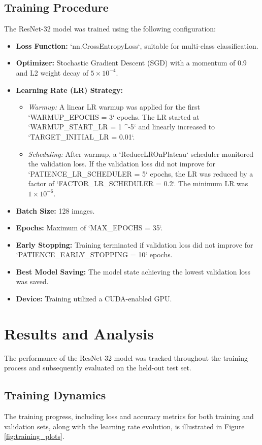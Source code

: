 \documentclass[11pt, a4paper]{article}
\begin{document}
\subsection{Training Procedure}
The ResNet-32 model was trained using the following configuration:
\begin{itemize}[itemsep=0.5em]
    \item \textbf{Loss Function:} `nn.CrossEntropyLoss`, suitable for multi-class classification.
    \item \textbf{Optimizer:} Stochastic Gradient Descent (SGD) with a momentum of 0.9 and L2 weight decay of $5 \times 10^{-4}$.
    \item \textbf{Learning Rate (LR) Strategy:}
        \begin{itemize}[itemsep=0.3em]
            \item \textit{Warmup:} A linear LR warmup was applied for the first `WARMUP_EPOCHS = 3` epochs. The LR started at `WARMUP_START_LR = 1 ^{-5}` and linearly increased to `TARGET_INITIAL_LR = 0.01`.
            \item \textit{Scheduling:} After warmup, a `ReduceLROnPlateau` scheduler monitored the validation loss. If the validation loss did not improve for `PATIENCE_LR_SCHEDULER = 5` epochs, the LR was reduced by a factor of `FACTOR_LR_SCHEDULER = 0.2`. The minimum LR was $1 \times 10^{-6}$.
        \end{itemize}
    \item \textbf{Batch Size:} 128 images.
    \item \textbf{Epochs:} Maximum of `MAX_EPOCHS = 35`.
    \item \textbf{Early Stopping:} Training terminated if validation loss did not improve for `PATIENCE_EARLY_STOPPING = 10` epochs.
    \item \textbf{Best Model Saving:} The model state achieving the lowest validation loss was saved.
    \item \textbf{Device:} Training utilized a CUDA-enabled GPU.
\end{itemize}

\clearpage %
\section{Results and Analysis}
The performance of the ResNet-32 model was tracked throughout the training process and subsequently evaluated on the held-out test set.

\subsection{Training Dynamics}
The training progress, including loss and accuracy metrics for both training and validation sets, along with the learning rate evolution, is illustrated in Figure \ref{fig:training_plots}.
\end{document}
